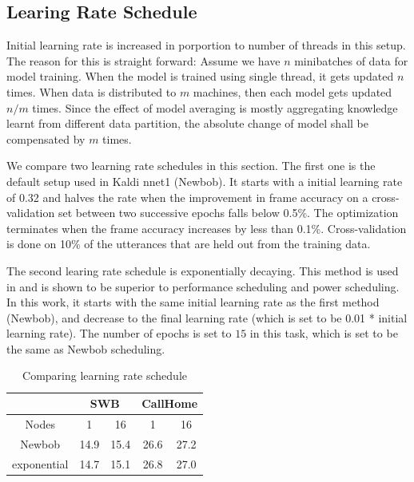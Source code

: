 \documentclass{article}
\begin{document}
\subsection{Learing Rate Schedule}
Initial learning rate is increased in porportion to number of threads in this setup. The reason for this is straight forward:
Assume we have $n$ minibatches of data for model training. When the model is trained using single thread, it gets updated $n$
times. When data is distributed to $m$ machines, then each model gets updated $n/m$ times. Since the effect of model averaging 
is mostly aggregating knowledge learnt from different data partition, the absolute change of model shall be compensated by 
$m$ times.

We compare two learning rate schedules in this section. The first one is the default setup used in Kaldi nnet1 (Newbob). 
It starts with a initial learning rate of 0.32 and halves the rate when the improvement in frame accuracy on a cross-validation 
set between two successive epochs falls below 0.5\%. The optimization terminates when the frame accuracy increases by less 
than 0.1\%. Cross-validation is done on 10\% of the utterances that are held out from the training data.

The second learing rate schedule is exponentially decaying. This method is used in \cite{senior2013empirical,povey2014parallel} 
and is shown to be superior to performance scheduling and power scheduling. In this work, it starts with the same initial learning
rate as the first method (Newbob), and decrease to the final learning rate (which is set to be 0.01 * initial learning rate). The
number of epochs is set to $15$ in this task, which is set to be the same as Newbob scheduling.

\begin{table}
  \centering
  \begin{tabular}{c|c|c|c|c}
    \hline
    & \multicolumn{2}{c|}{SWB}  & \multicolumn{2}{c}{CallHome} \\
    \hline
    Nodes       &  1      & 16    &  1    & 16 \\
    \hline
    Newbob      & 14.9    & 15.4  & 26.6  & 27.2 \\
    \hline
    exponential & 14.7    & 15.1  & 26.8  & 27.0 \\
    \hline
  \end{tabular}
  \caption{Comparing learning rate schedule}
  \label{tab:init}
\end{table}
\end{document}
